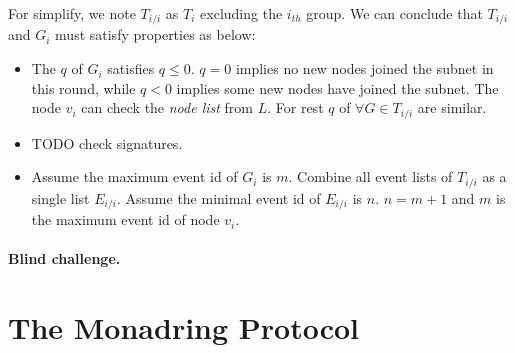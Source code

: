 \documentclass[11pt]{article}
\begin{document}
For simplify, we note $T_{i/i}$ as $T_{i}$ excluding the $i_{th}$ group. We can conclude that $T_{i/i}$ and $G_{i}$ must satisfy properties as below:

\begin{itemize}
\item The $q$ of $G_{i}$ satisfies \(q \leq 0\). $q=0$ implies no new nodes joined the subnet in this round, while $q < 0$ implies some new nodes have joined the subnet. The node $v_{i}$ can check the \textit{node list} from $L$.
For rest $q$ of $\forall G \in T_{i/i}$ are similar.
\item TODO check signatures.
\item Assume the maximum event id of $G_{i}$ is $m$. Combine all event lists of $T_{i/i}$ as a single list $E_{i/i}$. Assume the minimal event id of $E_{i/i}$ is $n$.
\(n = m+1\) and $m$ is the maximum event id of node $v_{i}$.
\end{itemize}


\paragraph{Blind challenge.} %

\section{The Monadring Protocol}


\end{document}

